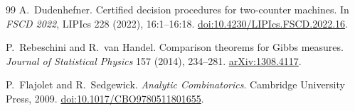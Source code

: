 \begin{thebibliography}{99}
 A.~Dudenhefner.
Certified decision procedures for two-counter machines.
In \emph{FSCD 2022}, LIPIcs 228 (2022), 16:1--16:18.
\href{https://doi.org/10.4230/LIPIcs.FSCD.2022.16}{doi:10.4230/LIPIcs.FSCD.2022.16}.

 P.~Rebeschini and R.~van Handel.
Comparison theorems for Gibbs measures.
\emph{Journal of Statistical Physics} 157 (2014), 234--281.
\href{https://arxiv.org/abs/1308.4117}{arXiv:1308.4117}.

 P.~Flajolet and R.~Sedgewick.
\emph{Analytic Combinatorics}.
Cambridge University Press, 2009.
\href{https://doi.org/10.1017/CBO9780511801655}{doi:10.1017/CBO9780511801655}.

\end{thebibliography}
